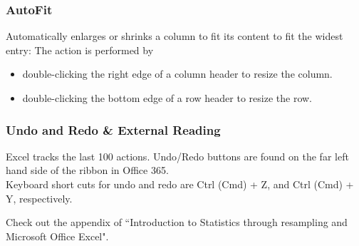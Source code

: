 \documentclass[12pt]{beamer}
\begin{document}
	\begin{frame}
		\frametitle{AutoFit}
		Automatically enlarges or shrinks a column to fit its content to fit the widest entry:
		The action is performed by
		\begin{itemize}
			\item double-clicking the right edge of a column header to resize the column.
			\item double-clicking the bottom edge of a row header to resize the row.
		\end{itemize} 
		
	\end{frame}
	\begin{frame}
		\frametitle{Undo and Redo \& External Reading}
		Excel tracks the last 100 actions.
		Undo/Redo buttons are found on the far left hand side of the ribbon in Office 365. \\
		\bigskip
		Keyboard short cuts for undo and redo are Ctrl (Cmd) + Z, and Ctrl (Cmd) + Y, respectively.
		
		\bigskip
		Check out the appendix of ``Introduction to Statistics through resampling and Microsoft Office Excel".
		
	\end{frame}
	
\end{document}
